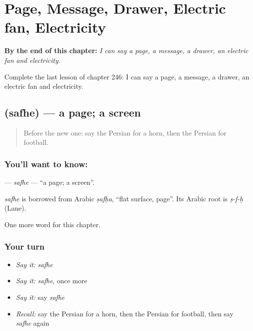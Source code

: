 
\chapter{Page, Message, Drawer, Electric fan, Electricity}
\label{ch:fa-page-message-drawer-electric-fan-electricity}

\begin{chapteropening}
\textbf{By the end of this chapter:} \emph{I can say a page, a message, a drawer, an electric fan and electricity.}

Complete the last lesson of chapter 246: I can say a page, a message, a drawer, an electric fan and electricity.
\end{chapteropening}

\section[\texorpdfstring{\fa{صفحه} (safhe)}{صفحه (safhe)}]{ (safhe) — a page; a screen}

\label{lesson:FA-C246-safhe}



\begin{quote}
Before the new one: say the Persian for a horn, then the Persian for football.
\end{quote}

\subsection*{You'll want to know: }
\textbf{} — \emph{safhe} — \textquotedblleft{}a page; a screen\textquotedblright{}.

\begin{cousinweb}
\emph{safhe} is borrowed from Arabic \emph{ṣafḥa}, \textquotedblleft{}flat surface, page\textquotedblright{}. Its Arabic root is \emph{ṣ-f-ḥ} (Lane).
\end{cousinweb}

\begin{grammarlens}[title={What you've built}]
One more word for this chapter.
\end{grammarlens}

\subsection*{Your turn}
\begin{itemize}
\raggedright
  \item \emph{Say it:} \emph{safhe}
  \item \emph{Say it:} \emph{safhe}, once more
  \item \emph{Say it:} say \emph{safhe}
  \item \emph{Recall:} say the Persian for a horn, then the Persian for football, then say \emph{safhe} again
\end{itemize}

